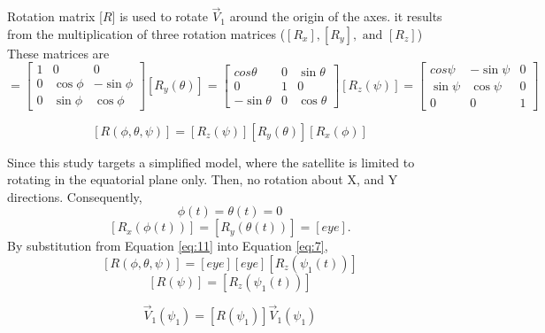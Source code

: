 \documentclass[11pt]{article}
\begin{document}
Rotation matrix [$R$] is used to rotate $\vec{V}_{1}$ around the origin of the axes. it results from the multiplication of three rotation matrices ($[R_x], [R_y], \text{ and } [R_z]$) These matrices are 
\begin{equation}
[R_x(\phi)] = \begin{bmatrix}
            1 &0 & 0 \\
            0 & \cos{\phi}& -\sin{\phi} \\
            0 & \sin{\phi}&\cos{\phi}
            \end{bmatrix}
[R_y(\theta)] = \begin{bmatrix}
            cos{\theta} &0 & \sin{\theta} \\
            0 & 1& 0 \\
            -\sin{\theta}&0 & \cos{\theta}
            \end{bmatrix}
[R_z(\psi)] = \begin{bmatrix}
            cos{\psi}  &  -\sin{\psi}  &  0    \\
            \sin{\psi}&   \cos{\psi}    & 0\\
            0          &    0   & 1          
            \end{bmatrix}        
\end{equation}

\begin{equation}\label{eq:11}
[R(\phi, \theta, \psi)]= [R_z(\psi)][R_y(\theta)][R_x(\phi)]
\end{equation}


Since this study targets a simplified model, where the satellite is limited to rotating in the equatorial plane only. Then, no rotation about X, and Y directions. 
Consequently,
\begin{equation}\label{fig:6}
    \phi(t) = \theta(t) = 0 
    \end{equation}
\begin{equation}\label{eq:7}
    [R_x(\phi(t))]=[R_y(\theta(t))]=[eye] .
\end{equation}
By substitution from Equation \ref{eq:11} into Equation \ref{eq:7},
\begin{equation}\label{eq:04}
    [R(\phi, \theta, \psi)] = [eye] [ eye] [R_z(\psi_1(t))]
\end{equation}
\begin{equation}\label{eq:04a}
    [R(\psi)] = [R_z(\psi_1(t))]
\end{equation}

\begin{equation}\label{eq:05}
    \vec{V}_1(\psi_1) = [R(\psi_1)] \vec{V}_1(\psi_1)  
\end{equation}
\end{document}
